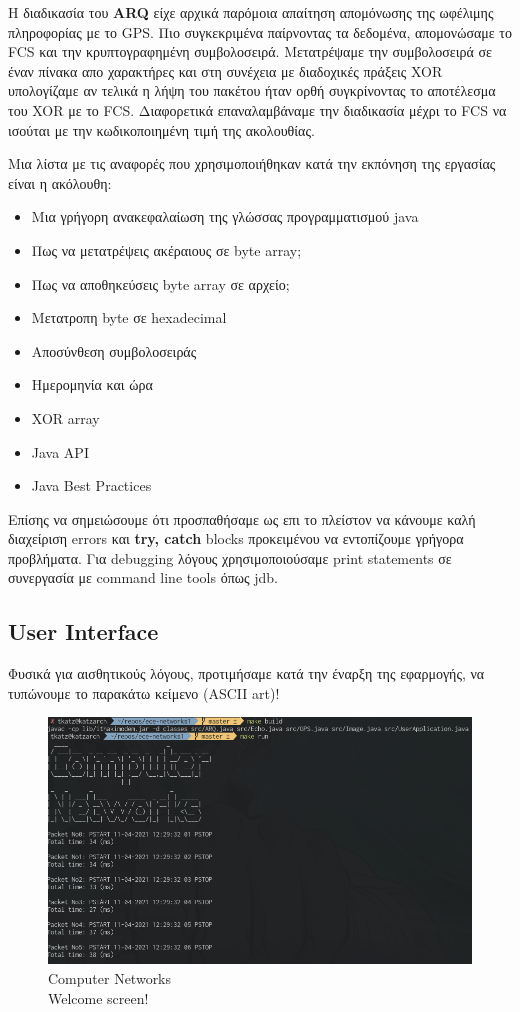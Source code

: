 \documentclass[hidelinks, 12pt, a4paper]{article}
\begin{document}
Η διαδικασία του \textbf{ARQ} είχε αρχικά παρόμοια απαίτηση απομόνωσης της ωφέλιμης πληροφορίας με το GPS. Πιο συγκεκριμένα παίρνοντας τα δεδομένα, απομονώσαμε το FCS και την κρυπτογραφημένη συμβολοσειρά. Μετατρέψαμε την συμβολοσειρά σε έναν πίνακα απο χαρακτήρες και στη συνέχεια με διαδοχικές πράξεις XOR υπολογίζαμε αν τελικά η λήψη του πακέτου ήταν ορθή συγκρίνοντας το αποτέλεσμα του XOR με το FCS. Διαφορετικά επαναλαμβάναμε την διαδικασία μέχρι το FCS να ισούται με την κωδικοποιημένη τιμή της ακολουθίας.

Μια λίστα με τις αναφορές που χρησιμοποιήθηκαν κατά την εκπόνηση της εργασίας είναι η ακόλουθη:

\begin{itemize}
    \item Μια γρήγορη ανακεφαλαίωση της γλώσσας προγραμματισμού java \cite{derek}
    \item Πως να μετατρέψεις ακέραιους σε byte array; \cite{int2byte}
    \item Πως να αποθηκεύσεις byte array σε αρχείο; \cite{javafile}
    \item Μετατροπη byte σε hexadecimal \cite{programizhex}
    \item Αποσύνθεση συμβολοσειράς \cite{stackparsestring}
    \item Ημερομηνία και ώρα \cite{timeAndDate}
    \item XOR array \cite{xor}
    \item Java API \cite{javaDocs}
    \item Java Best Practices \cite{javaPractice}
\end{itemize}

Επίσης να σημειώσουμε ότι προσπαθήσαμε ως επι το πλείστον να κάνουμε καλή διαχείριση errors και \textbf{try, catch} blocks προκειμένου να εντοπίζουμε γρήγορα προβλήματα. Για debugging λόγους χρησιμοποιούσαμε print statements σε συνεργασία με command line tools όπως jdb.

\subsection{User Interface}

Φυσικά για αισθητικούς λόγους, προτιμήσαμε κατά την έναρξη της εφαρμογής, να τυπώνουμε το παρακάτω κείμενο (ASCII art)!

\begin{figure}[h!]
\centering
	\includegraphics[height=.3\textheight, width=.8\textwidth]{assets/ui_welcome.png}
	\caption{Computer Networks \\ Welcome screen!} 
\end{figure}
\end{document}
